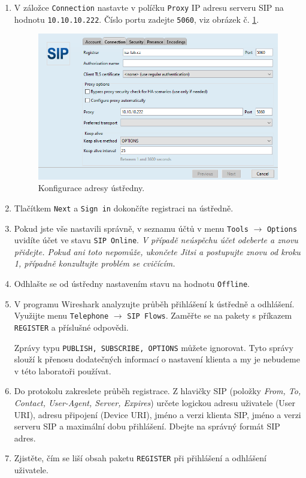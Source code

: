 \documentclass[a4paper,11pt]{article}
\begin{document}
\begin{enumerate}
    \item V záložce {\tt Connection} nastavte v políčku {\tt Proxy} IP adresu serveru SIP na hodnotu {\tt 10.10.10.222}. Číslo portu zadejte {\tt 5060}, viz obrázek č. \ref{fig:registration2}. 
      \begin{figure}[h!]
        \centering
        \includegraphics[scale=0.6]{img/jitsi-registration2b.png}
        \caption{Konfigurace adresy ústředny.}
        \label{fig:registration2}
      \end{figure}
    \item Tlačítkem {\tt Next} a {\tt Sign in} dokončíte registraci na ústředně.
    \item  Pokud jste vše nastavili správně, v seznamu účtů v menu {\tt Tools} $\rightarrow$ {\tt Options} uvidíte účet ve stavu {\tt SIP Online}. {\it V případě neúspěchu účet odeberte a znovu přidejte. Pokud ani toto nepomůže, ukončete Jitsi a postupujte znovu od kroku 1, případně konzultujte problém se cvičícím.}
    \item Odhlašte se od ústředny nastavením stavu na hodnotu {\tt Offline}. 
    \item V programu Wireshark analyzujte průběh přihlášení k ústředně a odhlášení. Využijte menu {\tt Telephone} $\rightarrow$ {\tt SIP Flows}. Zaměřte se na pakety s příkazem {\tt REGISTER} a příslušné odpovědi.

      {\small Zprávy typu {\tt PUBLISH, SUBSCRIBE, OPTIONS} můžete ignorovat. Tyto správy slouží k přenosu dodatečných informací o nastavení klienta a my je nebudeme v této laboratoři používat.}
    \item Do protokolu zakreslete průběh registrace. Z hlavičky SIP (položky {\em From, To, Contact, User-Agent, Server, Expires}) určete logickou adresu uživatele (User URI), adresu připojení (Device URI), jméno a verzi klienta SIP, jméno a verzi serveru SIP a maximální dobu přihlášení. Dbejte na správný formát SIP adres.
    \item Zjistěte, čím se liší obsah paketu {\tt REGISTER} při přihlášení a odhlášení uživatele.
\end{enumerate}
\end{document}
